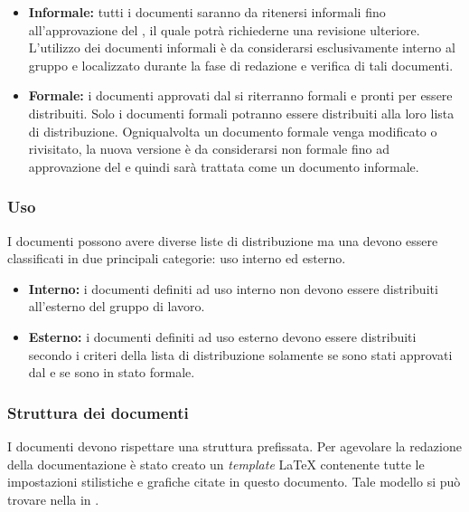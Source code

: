 \documentclass[12pt,a4paper]{article}
\begin{document}
\begin{itemize}
	\item \textbf{Informale:} tutti i documenti saranno da ritenersi informali fino all'approvazione del \PM, il quale potrà richiederne una revisione ulteriore. L'utilizzo dei documenti informali è da considerarsi esclusivamente interno al gruppo e localizzato durante la fase di redazione e verifica di tali documenti.
	\item \textbf{Formale:} i documenti approvati dal \PM{} si riterranno formali e pronti per essere distribuiti. Solo i documenti formali potranno essere distribuiti alla loro lista di distribuzione. Ogniqualvolta un documento formale venga modificato o rivisitato, la nuova versione è da considerarsi non formale fino ad approvazione del \PM e quindi sarà trattata come un documento informale.
\end{itemize}

\subsubsection{Uso}
I documenti possono avere diverse liste di distribuzione ma una devono essere classificati in due principali categorie: uso interno ed esterno.

\begin{itemize}
	\item \textbf{Interno:} i documenti definiti ad uso interno non devono essere distribuiti all'esterno del gruppo di lavoro.
	\item \textbf{Esterno:} i documenti definiti ad uso esterno devono essere distribuiti secondo i criteri della lista di distribuzione solamente se sono stati approvati dal \PM{} e se sono in stato formale.  
\end{itemize}

\subsubsection{Struttura dei documenti}
I documenti devono rispettare una struttura prefissata. Per agevolare la redazione della documentazione è stato creato un \emph{template} \LaTeX{} contenente tutte le impostazioni stilistiche e grafiche citate in questo documento. Tale modello si può trovare nella  in .
\end{document}
